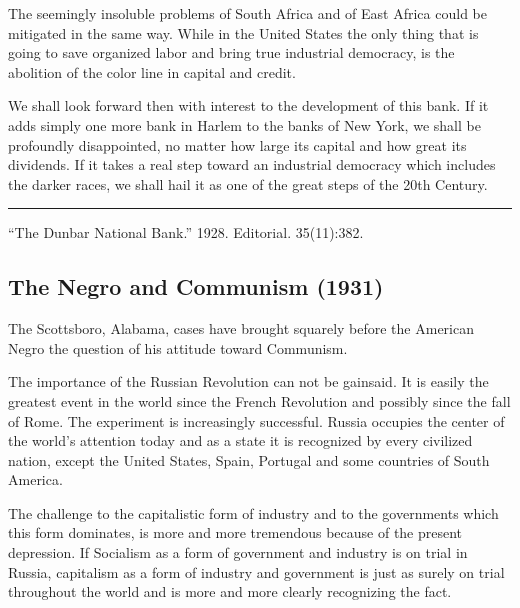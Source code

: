 \documentclass[letterpaper,10pt,english]{jupyterBook}
\begin{document}
\sphinxAtStartPar
The seemingly insoluble problems of South Africa and of East Africa could be mitigated in the same way. While in the United States the only thing that is going to save organized labor and bring true industrial democracy, is the abolition of the color line in capital and credit.

\sphinxAtStartPar
We shall look forward then with interest to the development of this bank. If it adds simply one more bank in Harlem to the banks of New York, we shall be profoundly disappointed, no matter how large its capital and how great its dividends. If it takes a real step toward an industrial democracy which includes the darker races, we shall hail it as one of the great steps of the 20th Century.


\bigskip\hrule\bigskip


\sphinxAtStartPar
{} “The Dunbar National Bank.” 1928. Editorial.  35(11):382.


\subsection{The Negro and Communism (1931)}
\label{\detokenize{Volumes/38/09/negro_and_communism:the-negro-and-communism-1931}}\label{\detokenize{Volumes/38/09/negro_and_communism::doc}}
\sphinxAtStartPar
The Scottsboro, Alabama, cases have brought squarely before the American Negro the question of his attitude toward Communism.

\sphinxAtStartPar
The importance of the Russian Revolution can not be gainsaid. It is easily the greatest event in the world since the French Revolution and possibly since the fall of Rome. The experiment is increasingly successful. Russia occupies the center of the world’s attention today and as a state it is recognized by every civilized nation, except the United States, Spain, Portugal and some countries of South America.

\sphinxAtStartPar
The challenge to the capitalistic form of industry and to the governments which this form dominates, is more and more tremendous because of the present depression. If Socialism as a form of government and industry is on trial in Russia, capitalism as a form of industry and government is just as surely on trial throughout the world and is more and more clearly recognizing the fact.
\end{document}
